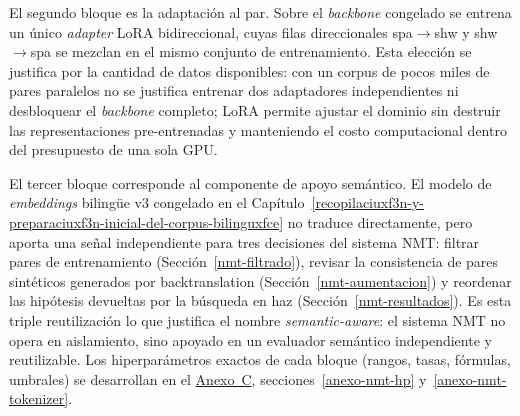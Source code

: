 \documentclass[12pt,a4paper,oneside]{book}
\begin{document}
\begin{figure}[htbp]
{%
}
\end{figure}

El segundo bloque es la adaptación al par. Sobre el \emph{backbone} congelado se entrena un único \emph{adapter} LoRA bidireccional, cuyas filas direccionales spa\(\rightarrow\)shw y shw\(\rightarrow\)spa se mezclan en el mismo conjunto de entrenamiento. Esta elección se justifica por la cantidad de datos disponibles: con un corpus de pocos miles de pares paralelos no se justifica entrenar dos adaptadores independientes ni desbloquear el \emph{backbone} completo; LoRA permite ajustar el dominio sin destruir las representaciones pre-entrenadas y manteniendo el costo computacional dentro del presupuesto de una sola GPU.

El tercer bloque corresponde al componente de apoyo semántico. El modelo de \emph{embeddings} bilingüe v3 congelado en el Capítulo~\ref{recopilaciuxf3n-y-preparaciuxf3n-inicial-del-corpus-bilinguxfce} no traduce directamente, pero aporta una señal independiente para tres decisiones del sistema NMT: filtrar pares de entrenamiento (Sección~\ref{nmt-filtrado}), revisar la consistencia de pares sintéticos generados por backtranslation (Sección~\ref{nmt-aumentacion}) y reordenar las hipótesis devueltas por la búsqueda en haz (Sección~\ref{nmt-resultados}). Es esta triple reutilización lo que justifica el nombre \emph{semantic-aware}: el sistema NMT no opera en aislamiento, sino apoyado en un evaluador semántico independiente y reutilizable. Los hiperparámetros exactos de cada bloque (rangos, tasas, fórmulas, umbrales) se desarrollan en el \hyperref[anexo-nmt-reproducible]{Anexo~C}, secciones~\ref{anexo-nmt-hp} y~\ref{anexo-nmt-tokenizer}.
\end{document}
